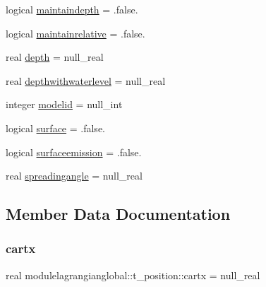 \begin{DoxyCompactItemize}
\item 
logical \mbox{\hyperlink{structmodulelagrangianglobal_1_1t__position_afbd5bba26bd8b609037d4b8f41c3c47f}{maintaindepth}} = .false.
\item 
logical \mbox{\hyperlink{structmodulelagrangianglobal_1_1t__position_a6fa7d79aec34a386ca2a80c274b2148b}{maintainrelative}} = .false.
\item 
real \mbox{\hyperlink{structmodulelagrangianglobal_1_1t__position_a1f6b84ee5721e15b2ed38a73210f3622}{depth}} = null\+\_\+real
\item 
real \mbox{\hyperlink{structmodulelagrangianglobal_1_1t__position_a6b8f87f4687b992669a1a7e75c49ee06}{depthwithwaterlevel}} = null\+\_\+real
\item 
integer \mbox{\hyperlink{structmodulelagrangianglobal_1_1t__position_afbf6b60b4d095e5ced8bc6d09e490234}{modelid}} = null\+\_\+int
\item 
logical \mbox{\hyperlink{structmodulelagrangianglobal_1_1t__position_a892918671f156c69315ef98b21fce780}{surface}} = .false.
\item 
logical \mbox{\hyperlink{structmodulelagrangianglobal_1_1t__position_aa767c6f33abac7650a89966c1a13b672}{surfaceemission}} = .false.
\item 
real \mbox{\hyperlink{structmodulelagrangianglobal_1_1t__position_ac31b9cba8ee86e2396e3576d34b31f84}{spreadingangle}} = null\+\_\+real
\end{DoxyCompactItemize}


\subsection{Member Data Documentation}
\mbox{\label{structmodulelagrangianglobal_1_1t__position_afb00ff6e531d7837c6c1c2917f4bff6f}} 
\subsubsection{\texorpdfstring{cartx}{cartx}}
{\footnotesize\ttfamily real modulelagrangianglobal\+::t\+\_\+position\+::cartx = null\+\_\+real\hspace{0.3cm}{\ttfamily [private]}}

\mbox{\label{structmodulelagrangianglobal_1_1t__position_a610ac2aa6f3adea2efcbd677201a5ec0}} 
